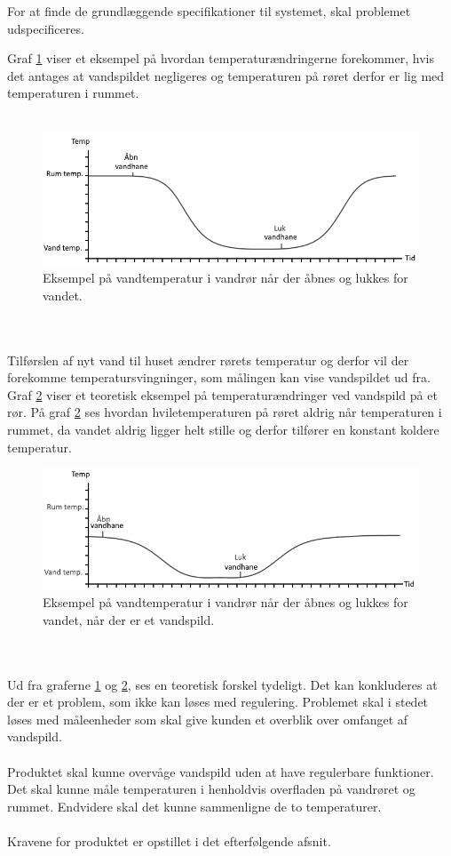 For at finde de grundlæggende specifikationer til systemet, skal problemet udspecificeres.  

Graf \ref{vandspild_graf_normal} viser et eksempel på hvordan temperaturændringerne forekommer, hvis det antages at vandspildet negligeres og temperaturen på røret derfor er lig med temperaturen i rummet. 
\\
\\
\begin{figure}[h!]
  \centering
  \includegraphics[width=1\textwidth]{figures/vandspild_graf_normal.png}
  \caption{Eksempel på vandtemperatur i vandrør når der åbnes og lukkes for vandet.}
  \label{vandspild_graf_normal}
\end{figure}
\\
\\
Tilførslen af nyt vand til huset ændrer rørets temperatur og derfor vil der forekomme temperatursvingninger, som målingen kan vise vandspildet ud fra. Graf \ref{vandspild_graf_spild} viser et teoretisk eksempel på temperaturændringer ved vandspild på et rør.
\newpage
På graf \ref{vandspild_graf_spild} ses hvordan hviletemperaturen på røret aldrig når temperaturen i rummet, da vandet aldrig ligger helt stille og derfor tilfører en konstant koldere temperatur.
\begin{figure}[h!]
  \centering
  \includegraphics[width=1\textwidth]{figures/vandspild_graf_spild.png}
  \caption{Eksempel på vandtemperatur i vandrør når der åbnes og lukkes for vandet, når der er et vandspild.}
  \label{vandspild_graf_spild}
\end{figure}
\\
\\
Ud fra graferne \ref{vandspild_graf_normal} og \ref{vandspild_graf_spild}, ses en teoretisk forskel tydeligt. Det kan konkluderes at der er et problem, som ikke kan løses med regulering. Problemet skal i stedet løses med måleenheder som skal give kunden et overblik over omfanget af vandspild.
\\
\\
Produktet skal kunne overvåge vandspild uden at have regulerbare funktioner. Det skal kunne måle temperaturen i henholdvis overfladen på vandrøret og rummet. Endvidere skal det kunne sammenligne de to temperaturer.
\\
\\
Kravene for produktet er opstillet i det efterfølgende afsnit.     